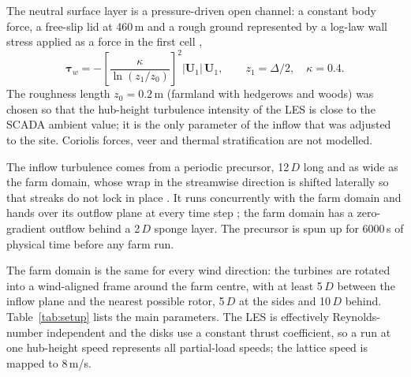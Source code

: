 \documentclass[11pt,a4paper]{article}
\begin{document}
The neutral surface layer is a pressure-driven open channel: a constant body force, a free-slip lid at 460\,m and
a rough ground represented by a log-law wall stress applied as a force in the first cell
\citep[local-velocity form, after][]{moeng1984les},
\begin{equation}
  \boldsymbol{\tau}_w = -\left[\frac{\kappa}{\ln(z_1/z_0)}\right]^2 \lvert \mathbf{U}_1 \rvert\, \mathbf{U}_1 ,
  \qquad z_1 = \Delta/2 , \quad \kappa = 0.4 .
\end{equation}
The roughness length $z_0 = 0.2$\,m (farmland with hedgerows and woods) was chosen so that the hub-height
turbulence intensity of the LES is close to the SCADA ambient value; it is the only parameter of the inflow that
was adjusted to the site. Coriolis forces, veer and thermal stratification are not modelled.

The inflow turbulence comes from a periodic precursor, 12\,$D$ long and as wide as the farm domain, whose wrap in
the streamwise direction is shifted laterally so that streaks do not lock in place \citep{munters2016shifted}.
It runs concurrently with the farm domain and hands over its outflow plane at every time step
\citep{stevens2014concurrent}; the farm domain has a zero-gradient outflow behind a 2\,$D$ sponge layer. The
precursor is spun up for 6000\,s of physical time before any farm run.

The farm domain is the same for every wind direction: the turbines are rotated into a wind-aligned frame around
the farm centre, with at least 5\,$D$ between the inflow plane and the nearest possible rotor, 5\,$D$ at the sides
and 10\,$D$ behind. Table~\ref{tab:setup} lists the main parameters. The LES is effectively Reynolds-number
independent and the disks use a constant thrust coefficient, so a run at one hub-height speed represents all
partial-load speeds; the lattice speed is mapped to 8\,m/s.
\end{document}
